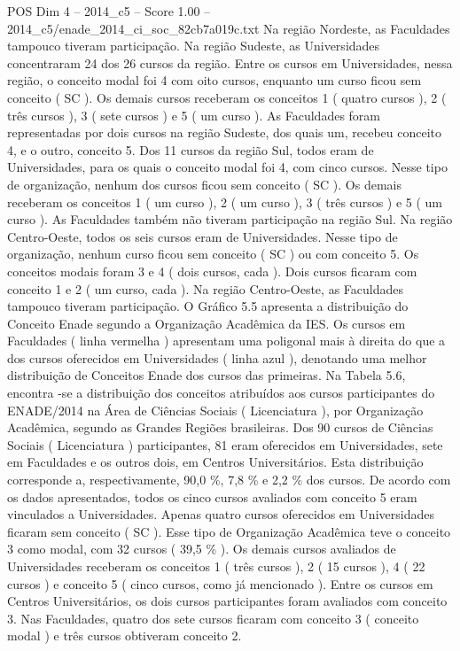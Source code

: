 \begin{textsample}{POS Dim 4 – 2014\_c5 – Score 1.00 – 2014\_c5/enade\_2014\_ci\_soc\_82cb7a019c.txt}
Na região Nordeste, as Faculdades tampouco tiveram participação.
Na região Sudeste, as Universidades concentraram 24 dos 26 cursos da região.
Entre os cursos em Universidades, nessa região, o conceito modal foi 4 com oito cursos, enquanto um curso ficou sem conceito ( SC ).
Os demais cursos receberam os conceitos 1 ( quatro cursos ), 2 ( três cursos ), 3 ( sete cursos ) e 5 ( um curso ).
As Faculdades foram representadas por dois cursos na região Sudeste, dos quais um, recebeu conceito 4, e o outro, conceito 5.
Dos 11 cursos da região Sul, todos eram de Universidades, para os quais o conceito modal foi 4, com cinco cursos.
Nesse tipo de organização, nenhum dos cursos ficou sem conceito ( SC ).
Os demais receberam os conceitos 1 ( um curso ), 2 ( um curso ), 3 ( três cursos ) e 5 ( um curso ).
As Faculdades também não tiveram participação na região Sul.
Na região Centro-Oeste, todos os seis cursos eram de Universidades.
Nesse tipo de organização, nenhum curso ficou sem conceito ( SC ) ou com conceito 5.
Os conceitos modais foram 3 e 4 ( dois cursos, cada ).
Dois cursos ficaram com conceito 1 e 2 ( um curso, cada ).
Na região Centro-Oeste, as Faculdades tampouco tiveram participação.
O Gráfico 5.5 apresenta a distribuição do Conceito Enade segundo a Organização Acadêmica da IES.
Os cursos em Faculdades ( linha vermelha ) apresentam uma poligonal mais à direita do que a dos cursos oferecidos em Universidades ( linha azul ), denotando uma melhor distribuição de Conceitos Enade dos cursos das primeiras.
Na Tabela 5.6, encontra -se a distribuição dos conceitos atribuídos aos cursos participantes do ENADE/2014 na Área de Ciências Sociais ( Licenciatura ), por Organização Acadêmica, segundo as Grandes Regiões brasileiras.
Dos 90 cursos de Ciências Sociais ( Licenciatura ) participantes, 81 eram oferecidos em Universidades, sete em Faculdades e os outros dois, em Centros Universitários.
Esta distribuição corresponde a, respectivamente, 90,0 \%, 7,8 \% e 2,2 \% dos cursos.
De acordo com os dados apresentados, todos os cinco cursos avaliados com conceito 5 eram vinculados a Universidades.
Apenas quatro cursos oferecidos em Universidades ficaram sem conceito ( SC ).
Esse tipo de Organização Acadêmica teve o conceito 3 como modal, com 32 cursos ( 39,5 \% ).
Os demais cursos avaliados de Universidades receberam os conceitos 1 ( três cursos ), 2 ( 15 cursos ), 4 ( 22 cursos ) e conceito 5 ( cinco cursos, como já mencionado ).
Entre os cursos em Centros Universitários, os dois cursos participantes foram avaliados com conceito 3.
Nas Faculdades, quatro dos sete cursos ficaram com conceito 3 ( conceito modal ) e três cursos obtiveram conceito 2.

\end{textsample}
